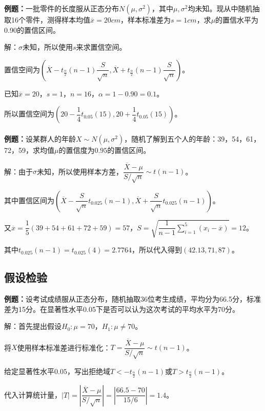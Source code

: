 \textbf{例题：}一批零件的长度服从正态分布$N(\mu,\sigma^2)$，其中$\mu,\sigma^2$均未知。现从中随机抽取16个零件，测得样本均值$\overline{x}=20cm$，样本标准差为$s=1cm$，求$\mu$的置信水平为0.90的置信区间。

解：$\sigma$未知，所以使用$s$来求置信空间。

置信空间为$(\overline{X}-t_\frac{\alpha}{2}(n-1)\dfrac{S}{\sqrt{n}},\overline{X}+t_\frac{\alpha}{2}(n-1)\dfrac{S}{\sqrt{n}})$。

已知$\overline{x}=20$，$s=1$，$n=16$，$\alpha=1-0.90=0.1$。

所以置信空间为$\left(20-\dfrac{1}{4}t_{0.05}(15),20+\dfrac{1}{4}t_{0.05}(15)\right)$。

\paragraph{}

\textbf{例题：}设某群人的年龄$X\sim N(\mu,\sigma^2)$，随机了解到五个人的年龄：39，54，61，72，59，求均值$\mu$的置信度为$0.95$的置信区间。

解：由于$\sigma$未知，所以使用样本方差，$\dfrac{\overline{X}-\mu}{S/\sqrt{n}}\sim t(n-1)$。

其中置信区间为$\left(\overline{X}-\dfrac{S}{\sqrt{n}}t_{0.025}(n-1),\overline{X}+\dfrac{S}{\sqrt{n}}t_{0.025}(n-1)\right)$。

又$\overline{x}=\dfrac{1}{5}(39+54+61+72+59)=57$，$S=\sqrt{\dfrac{1}{n-1}\sum\limits_{i=1}^5(x_i-\overline{x})}=12$。

其中$t_{0.025}(n-1)=t_{0.025}(4)=2.7764$，所以代入得到$(42.13,71,87)$。

\subsection{假设检验}

\textbf{例题：}设考试成绩服从正态分布，随机抽取36位考生成绩，平均分为66.5分，标准差为15分。在显著性水平0.05下是否可以认为这次考试的平均水平为70分。

解：首先提出假设$H_0:\mu=70$，$H_1:\mu\neq70$。

将$X$使用样本标准差进行标准化：$T=\dfrac{\overline{X}-\mu}{S/\sqrt{n}}\sim t(n-1)$。

给定显著性水平$0.05$，写出拒绝域$T<-t_{\frac{\alpha}{2}}(n-1)$或$T>t_{\frac{\alpha}{2}}(n-1)$。

代入计算统计量，$\vert T\vert=\left\vert\dfrac{\overline{X}-\mu}{S/\sqrt{n}}\right\vert=\left\vert\dfrac{66.5-70}{15/6}\right\vert=1.4$。


